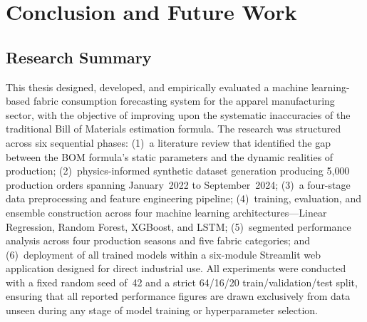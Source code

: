 \chapter{Conclusion and Future Work}
\label{ch:conclusion}
\sloppy
{}

\section{Research Summary}
This thesis designed, developed, and empirically evaluated a machine learning-based fabric consumption forecasting system for the apparel manufacturing sector, with the objective of improving upon the systematic inaccuracies of the traditional Bill of Materials estimation formula. The research was structured across six sequential phases: (1)~a literature review that identified the gap between the BOM formula's static parameters and the dynamic realities of production; (2)~physics-informed synthetic dataset generation producing 5{,}000 production orders spanning January~2022 to September~2024; (3)~a four-stage data preprocessing and feature engineering pipeline; (4)~training, evaluation, and ensemble construction across four machine learning architectures---Linear Regression, Random Forest, XGBoost, and LSTM; (5)~segmented performance analysis across four production seasons and five fabric categories; and (6)~deployment of all trained models within a six-module Streamlit web application designed for direct industrial use. All experiments were conducted with a fixed random seed of~42 and a strict 64/16/20 train/validation/test split, ensuring that all reported performance figures are drawn exclusively from data unseen during any stage of model training or hyperparameter selection.

\secdiv
